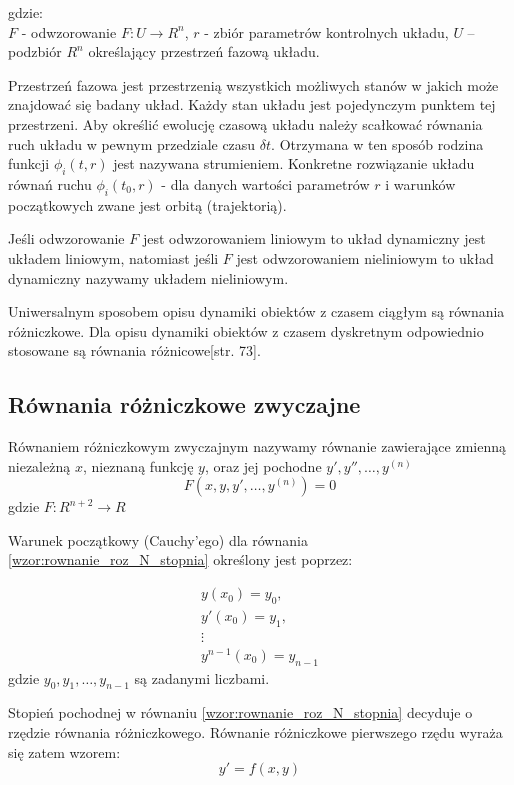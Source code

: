 gdzie: \\
$F$ - odwzorowanie $F:U \rightarrow R^n$,
$r$ - zbiór parametrów kontrolnych układu,
$U$ – podzbiór $R^n$ określający przestrzeń fazową układu.

Przestrzeń fazowa jest przestrzenią wszystkich możliwych stanów w jakich może znajdować się badany układ. Każdy stan układu jest pojedynczym punktem tej przestrzeni.
Aby określić ewolucję czasową układu należy scałkować równania ruch układu w pewnym przedziale czasu $\delta t$. Otrzymana w ten sposób rodzina funkcji $\phi_i(t,r)$ jest nazywana strumieniem. Konkretne rozwiązanie układu równań ruchu $\phi_i(t_0,r)$ - dla danych wartości parametrów $r$ i warunków początkowych zwane jest orbitą (trajektorią).

Jeśli odwzorowanie $F$ jest odwzorowaniem liniowym to układ dynamiczny jest układem liniowym, natomiast jeśli $F$ jest odwzorowaniem nieliniowym to układ dynamiczny nazywamy układem nieliniowym.

Uniwersalnym sposobem opisu dynamiki obiektów z czasem ciągłym są równania różniczkowe. Dla opisu dynamiki obiektów z czasem dyskretnym odpowiednio stosowane są równania różnicowe\cite{Gutenbaum}[str. 73].
\subsection{Równania różniczkowe zwyczajne}

Równaniem różniczkowym zwyczajnym nazywamy równanie zawierające zmienną niezależną $x$, nieznaną funkcję $y$, oraz jej pochodne $y', y'', \hdots, y^{(n)}$ \cite[str. 7]{BCh_2001}
\begin{equation}
	\label{wzor:rownanie_roz_N_stopnia}
	F(x,y,y',\hdots,y^{(n)}) = 0
\end{equation}
gdzie $F:R^{n+2} \rightarrow R$

Warunek początkowy (Cauchy'ego) dla równania \ref{wzor:rownanie_roz_N_stopnia} określony jest poprzez: 

\begin{equation}
\begin{array}{c}
y(x_0)       =  y_0,     \\
y'(x_0)      =  y_1,     \\
\vdots			   	     \\
y^{n-1}(x_0) = y_{n-1}
\end{array}
\end{equation}
gdzie $y_0, y_1, \hdots, y_{n-1}$ są zadanymi liczbami.

Stopień pochodnej w równaniu \ref{wzor:rownanie_roz_N_stopnia} decyduje o rzędzie równania różniczkowego. Równanie różniczkowe pierwszego rzędu wyraża się zatem wzorem:
\begin{equation}
	\label{wzor:rownanie_roz_I_stopnia}
	y' = f(x,y)
\end{equation}

